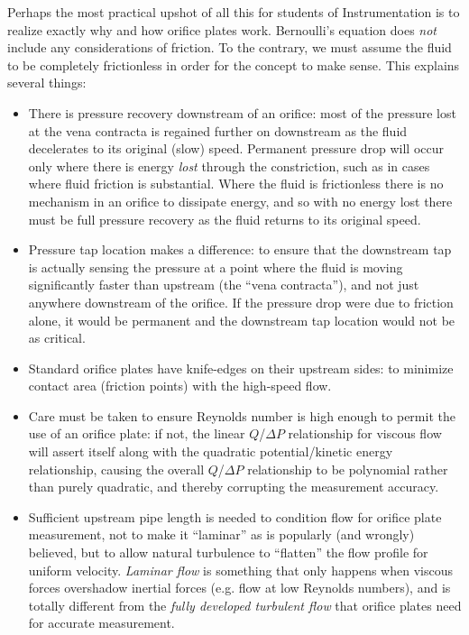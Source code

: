 Perhaps the most practical upshot of all this for students of Instrumentation is to realize exactly why and how orifice plates work.  Bernoulli's equation does \textit{not} include any considerations of friction.  To the contrary, we must assume the fluid to be completely frictionless in order for the concept to make sense.  This explains several things:

\begin{itemize}
\item There is pressure recovery downstream of an orifice: most of the pressure lost at the vena contracta is regained further on downstream as the fluid decelerates to its original (slow) speed.  Permanent pressure drop will occur only where there is energy \textit{lost} through the constriction, such as in cases where fluid friction is substantial.  Where the fluid is frictionless there is no mechanism in an orifice to dissipate energy, and so with no energy lost there must be full pressure recovery as the fluid returns to its original speed.
\item Pressure tap location makes a difference: to ensure that the downstream tap is actually sensing the pressure at a point where the fluid is moving significantly faster than upstream (the ``vena contracta''), and not just anywhere downstream of the orifice.  If the pressure drop were due to friction alone, it would be permanent and the downstream tap location would not be as critical.
\item Standard orifice plates have knife-edges on their upstream sides: to minimize contact area (friction points) with the high-speed flow.
\item Care must be taken to ensure Reynolds number is high enough to permit the use of an orifice plate: if not, the linear $Q$/$\Delta P$ relationship for viscous flow will assert itself along with the quadratic potential/kinetic energy relationship, causing the overall $Q$/$\Delta P$ relationship to be polynomial rather than purely quadratic, and thereby corrupting the measurement accuracy.
\item Sufficient upstream pipe length is needed to condition flow for orifice plate measurement, not to make it ``laminar'' as is popularly (and wrongly) believed, but to allow natural turbulence to ``flatten'' the flow profile for uniform velocity.  \textit{Laminar flow} is something that only happens when viscous forces overshadow inertial forces (e.g. flow at low Reynolds numbers), and is totally different from the \textit{fully developed turbulent flow} that orifice plates need for accurate measurement.
\end{itemize}

